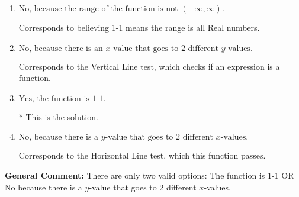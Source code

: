 \documentclass{extbook}[14pt]
\begin{document}
\begin{enumerate}
{\begin{enumerate}[label=\Alph*.]
Corresponds to believing 1-1 means the domain is all Real numbers.
\item \( \text{No, because the range of the function is not $(-\infty, \infty)$.} \)

Corresponds to believing 1-1 means the range is all Real numbers.
\item \( \text{No, because there is an $x$-value that goes to 2 different $y$-values.} \)

Corresponds to the Vertical Line test, which checks if an expression is a function.
\item \( \text{Yes, the function is 1-1.} \)

* This is the solution.
\item \( \text{No, because there is a $y$-value that goes to 2 different $x$-values.} \)

Corresponds to the Horizontal Line test, which this function passes.
\end{enumerate}

\textbf{General Comment:} There are only two valid options: The function is 1-1 OR No because there is a $y$-value that goes to 2 different $x$-values.
}
\end{enumerate}
\end{document}

